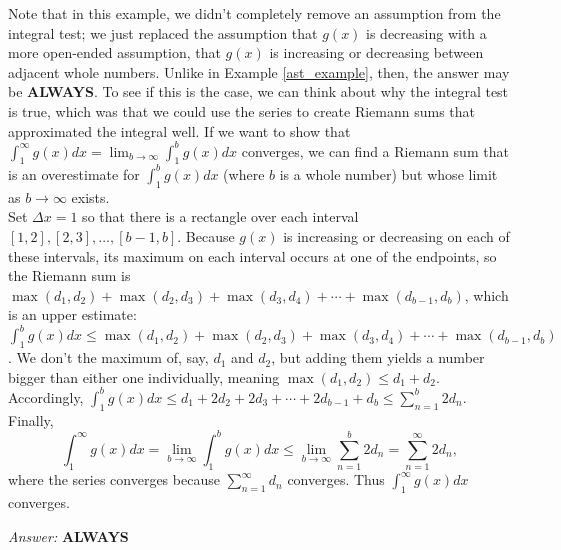 \documentclass{article}
\theoremstyle{definition} %
\begin{document}
Note that in this example, we didn't completely remove an assumption from the integral test; we just replaced the assumption that $g(x)$ is decreasing with a more open-ended assumption, that $g(x)$ is increasing or decreasing between adjacent whole numbers. Unlike in Example \ref{ast_example}, then, the answer may be \textbf{ALWAYS}. To see if this is the case, we can think about why the integral test is true, which was that we could use the series to create Riemann sums that approximated the integral well. If we want to show that $\displaystyle\int_1^\infty g(x)dx = \displaystyle\lim_{b \to \infty} \int_1^b g(x)dx$ converges, we can find a Riemann sum that is an overestimate for $\displaystyle\int_1^b g(x)dx$ (where $b$ is a whole number) but whose limit as $b \to \infty$ exists. \\

Set $\Delta x = 1$ so that there is a rectangle over each interval $[1,2],[2,3],\dots,[b-1,b]$. Because $g(x)$ is increasing or decreasing on each of these intervals, its maximum on each interval occurs at one of the endpoints, so the Riemann sum is $\max(d_1,d_2) + \max(d_2,d_3) + \max(d_3,d_4) + \cdots + \max(d_{b-1},d_b)$, which is an upper estimate: $\int_1^b g(x)dx \leq \max(d_1,d_2) + \max(d_2,d_3) + \max(d_3,d_4) + \cdots + \max(d_{b-1},d_b)$. We don't the maximum of, say, $d_1$ and $d_2$, but adding them yields a number bigger than either one individually, meaning $\max(d_1,d_2) \leq d_1 + d_2$. Accordingly, $\displaystyle\int_1^b g(x)dx \leq d_1 + 2d_2 + 2d_3 + \cdots + 2d_{b-1} + d_b \leq \displaystyle\sum_{n=1}^b 2d_n$. Finally, $$\int_1^\infty g(x)dx = \lim_{b \to \infty} \int_1^b g(x)dx \leq \lim_{b \to \infty} \sum_{n=1}^b 2d_n = \sum_{n=1}^\infty 2d_n,$$ where the series converges because $\displaystyle\sum_{n=1}^\infty d_n$ converges. Thus $\displaystyle\int_1^\infty g(x)dx$ converges.

\vspace{15pt}

\textit{Answer:} \textbf{ALWAYS} 
\end{document}
